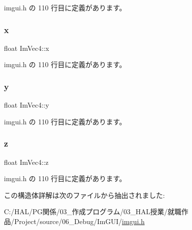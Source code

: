  imgui.\+h の 110 行目に定義があります。

\mbox{\label{struct_im_vec4_a2090f651f5e5b78fedae8dab87343db6}} 
\subsubsection{\texorpdfstring{x}{x}}
{\footnotesize\ttfamily float Im\+Vec4\+::x}



 imgui.\+h の 110 行目に定義があります。

\mbox{\label{struct_im_vec4_a6b4d00ae261be4fe54353c759c561fe7}} 
\subsubsection{\texorpdfstring{y}{y}}
{\footnotesize\ttfamily float Im\+Vec4\+::y}



 imgui.\+h の 110 行目に定義があります。

\mbox{\label{struct_im_vec4_aba6a75356917a28c967954bb29133a1a}} 
\subsubsection{\texorpdfstring{z}{z}}
{\footnotesize\ttfamily float Im\+Vec4\+::z}



 imgui.\+h の 110 行目に定義があります。



この構造体詳解は次のファイルから抽出されました\+:\begin{DoxyCompactItemize}
\item 
C\+:/\+H\+A\+L/\+P\+G関係/03\+\_\+作成プログラム/03\+\_\+\+H\+A\+L授業/就職作品/\+Project/source/06\+\_\+\+Debug/\+Im\+G\+U\+I/\mbox{\hyperlink{imgui_8h}{imgui.\+h}}\end{DoxyCompactItemize}
